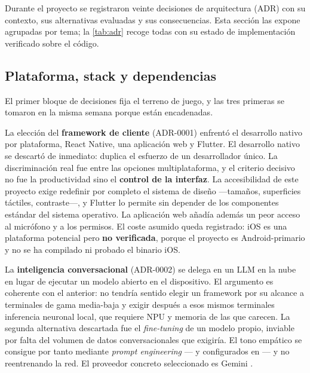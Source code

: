 Durante el proyecto se registraron veinte decisiones de arquitectura (ADR) con su contexto, sus
alternativas evaluadas y sus consecuencias. Esta sección las expone agrupadas por tema; la
\autoref{tab:adr} recoge todas con su estado de implementación verificado sobre el código.

\subsection{Plataforma, stack y dependencias}

El primer bloque de decisiones fija el terreno de juego, y las tres primeras se tomaron en la misma
semana porque están encadenadas.

La elección del \textbf{framework de cliente} (ADR-0001) enfrentó el desarrollo nativo por plataforma, React
Native, una aplicación web y Flutter. El desarrollo nativo se descartó de inmediato: duplica el esfuerzo de
un desarrollador único. La discriminación real fue entre las opciones multiplataforma, y el criterio
decisivo no fue la productividad sino el \textbf{control de la interfaz}. La accesibilidad de este proyecto
exige redefinir por completo el sistema de diseño ---tamaños, superficies táctiles, contraste---, y Flutter
lo permite sin depender de los componentes estándar del sistema operativo. La aplicación web añadía además
un peor acceso al micrófono y a los permisos. El coste asumido queda registrado: iOS es una plataforma
potencial pero \textbf{no verificada}, porque el proyecto es Android-primario y no se ha compilado ni
probado el binario iOS.

La \textbf{inteligencia conversacional} (ADR-0002) se delega en un LLM en la nube en lugar de ejecutar un
modelo abierto en el dispositivo. El argumento es coherente con el anterior: no tendría sentido elegir un
framework por su alcance a terminales de gama media-baja y exigir después a esos mismos terminales
inferencia neuronal local, que requiere NPU y memoria de las que carecen. La segunda alternativa
descartada fue el \emph{fine-tuning} de un modelo propio, inviable por falta del volumen de datos
conversacionales que exigiría. El tono empático se consigue por tanto mediante \emph{prompt engineering}
--- y  configurados en --- y no
reentrenando la red. El proveedor concreto seleccionado es Gemini .


